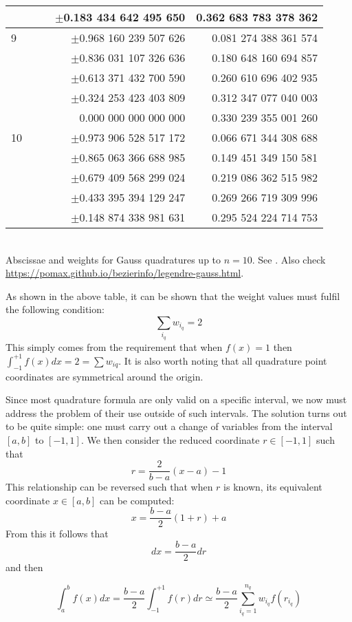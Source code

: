\begin{center}
\begin{tabular}{lllrr}
  & & & $\pm$0.183 434 642 495 650 & 0.362 683 783 378 362\\
\hline
9 & & & $\pm$0.968 160 239 507 626 & 0.081 274 388 361 574\\
  & & & $\pm$0.836 031 107 326 636 & 0.180 648 160 694 857\\
  & & & $\pm$0.613 371 432 700 590 & 0.260 610 696 402 935\\
  & & & $\pm$0.324 253 423 403 809 & 0.312 347 077 040 003\\
  & & & 0.000 000 000 000 000 & 0.330 239 355 001 260\\
\hline
10 &&& $\pm$0.973 906 528 517 172 & 0.066 671 344 308 688\\
   &&& $\pm$0.865 063 366 688 985 & 0.149 451 349 150 581\\
   &&& $\pm$0.679 409 568 299 024 & 0.219 086 362 515 982\\
   &&& $\pm$0.433 395 394 129 247 & 0.269 266 719 309 996\\
   &&& $\pm$0.148 874 338 981 631 & 0.295 524 224 714 753\\
\hline
\end{tabular}\\
{\captionfont Abscissae and weights for Gauss quadratures up to $n=10$. See \cite[p89]{li06}. Also check \url{https://pomax.github.io/bezierinfo/legendre-gauss.html}.}
\end{center}

As shown in the above table, it can be shown that the weight values must fulfil the following condition:
\begin{equation}
\sum_{i_q} w_{i_q}=2 \label{gq23}
\end{equation}
This simply comes from the requirement that when $f(x)=1$ then $\int_{-1}^{+1}f(x)dx=2=\sum w_{iq}$.
It is also worth noting that all quadrature point coordinates are symmetrical around the origin.

Since most quadrature formula are only valid on a specific interval, we now must address the problem 
of their use outside of such intervals. The solution turns out to be quite simple: one 
must carry out a change of variables from the interval $[a,b]$ to $[-1,1]$.
We then consider the reduced coordinate $r\in[-1,1]$ such that 
\begin{equation}
r=\frac{2}{b-a}(x-a)-1 
\end{equation}
This relationship can be reversed such that when $r$ is known, its equivalent coordinate 
$x\in[a,b]$ can be computed:
\begin{equation}
x=\frac{b-a}{2}(1+r)+a
\end{equation}
From this it follows that
\begin{equation}
dx=\frac{b-a}{2}dr
\end{equation}
and then 
\begin{mdframed}[backgroundcolor=blue!5]
\begin{equation}
\int_a^b f(x) dx  = \frac{b-a}{2} \int_{-1}^{+1} f(r) dr \simeq 
\frac{b-a}{2} \sum_{i_q=1}^{n_q} w_{i_q} f(r_{i_q})
\end{equation}
\end{mdframed}

